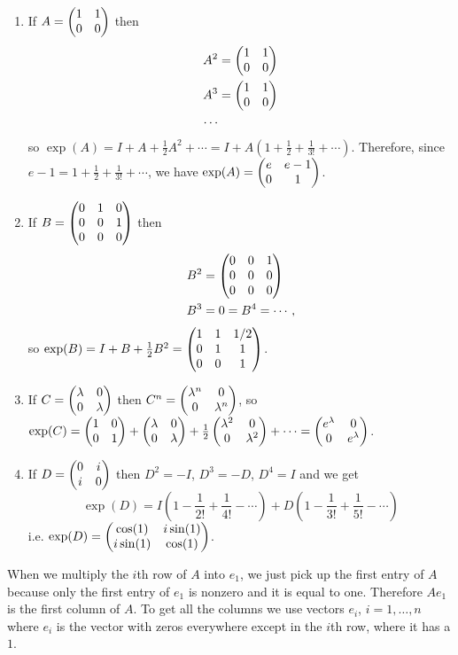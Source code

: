\documentclass{article}
\begin{document}
\begin{Solution}\label{sol:exr:exp}
\begin{enumerate}
\item If \(A=\begin{pmatrix} 1 & 1 \\ 0 & 0 \end{pmatrix}\) then
\begin{align*}
A^2&=\begin{pmatrix} 1 & 1 \\ 0 & 0 \end{pmatrix}\\
A^3&=\begin{pmatrix} 1 & 1 \\ 0 & 0 \end{pmatrix}\\
\cdots
\end{align*}
so \(\exp(A)=I+A+\frac{1}{2}A^2+\cdots=
I+A\left(1+\frac{1}{2}+\frac{1}{3!}+\cdots\right)\). Therefore,
since \(e-1=1+\frac{1}{2}+\frac{1}{3!}+\cdots\), we have
\(\exp(A)=\begin{pmatrix} e & e-1 \\ 0 & 1\end{pmatrix}\).
\item If \(B=\begin{pmatrix} 0 & 1 & 0 \\0 & 0 & 1 \\ 0 & 0 & 0\end{pmatrix}\) then
\begin{align*}
B^2&=\begin{pmatrix} 0 & 0 & 1 \\ 0 & 0 & 0 \\ 0 & 0 & 0 \end{pmatrix}\\
B^3&=0=B^4=\cdots,
\end{align*}
so \(\exp(B)=I+B+\frac{1}{2}B^2=\begin{pmatrix} 1 & 1 & 1/2 \\ 0 & 1 & 1 \\ 0
& 0 & 1\end{pmatrix}\).
\item If \(C=\begin{pmatrix} \lambda & 0 \\ 0 & \lambda\end{pmatrix}\) then \(C^n=\begin{pmatrix}
\lambda^n & 0 \\ 0 & \lambda^n\end{pmatrix}\), so \(\exp(C)=\begin{pmatrix} 1 & 0 \\ 0 &
1 \end{pmatrix}+\begin{pmatrix} \lambda & 0 \\ 0 & \lambda\end{pmatrix}+\frac{1}{2}\begin{pmatrix} \lambda^2 &
0 \\ 0 & \lambda^2\end{pmatrix}+\cdots=\begin{pmatrix} e^{\lambda} & 0 \\ 0 &
e^{\lambda}\end{pmatrix}\).
\item If \(D=\begin{pmatrix} 0 & i \\ i & 0 \end{pmatrix}\) then \(D^2=-I\), \(D^3=-D\),
\(D^4=I\) and we get
\[\exp(D)=I\left(1-\frac{1}{2!}+\frac{1}{4!}-\cdots\right)+
D\left(1-\frac{1}{3!}+\frac{1}{5!}-\cdots\right)\]
i.e. \(\exp(D)=\begin{pmatrix} \cos(1) & i\sin(1) \\ i\sin(1) &
\cos(1)\end{pmatrix}\). \qedhere


\end{enumerate}
\end{Solution}
\begin{Solution}\label{sol:exr:cols}
When we multiply the \(i\)th row of \(A\) into \(e_1\), we just pick
up the first entry of \(A\) because only the first entry of \(e_1\)
is nonzero and it is equal to one. Therefore \(Ae_1\) is the first
column of \(A\). To get all the columns we use vectors \(e_i\),
\(i=1,\ldots,n\) where \(e_i\) is the vector with zeros everywhere
except in the \(i\)th row, where it has a \(1\).


\end{Solution}
\end{document}
